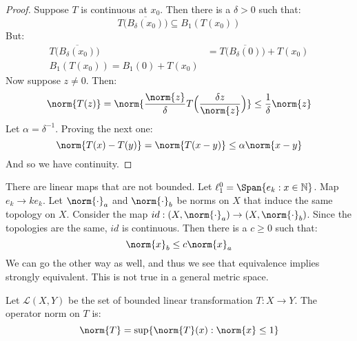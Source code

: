 \documentclass[crop=false,class=book,oneside]{standalone}
\begin{document}
        \begin{proof}
            Suppose $T$ is continuous at $x_{0}$. Then there is a
            $\delta>0$ such that:
            \begin{equation}
                T\Big(\overline{B_{\delta}(x_{0})}\big)
                \subseteq{B}_{1}(T(x_{0}))
            \end{equation}
            But:
            \begin{align}
                T\Big(\overline{B_{\delta}(x_{0})}\big)
                &=T\Big(\overline{B_{\delta}(0)}\big)+T(x_{0})\\
                B_{1}(T(x_{0}))=
                B_{1}(0)+T(x_{0})
            \end{align}
            Now suppose $z\ne{0}$. Then:
            \begin{equation}
                \norm{T(z)}=
                \norm{\frac{\norm{z}}{\delta}
                      T\Big(\frac{\delta{z}}{\norm{z}}\Big)}
                \leq\frac{1}{\delta}\norm{z}
            \end{equation}
            Let $\alpha=\delta^{\minus{1}}$.
            Proving the next one:
            \begin{equation}
                \norm{T(x)-T(y)}=\norm{T(x-y)}
                \leq\alpha\norm{x-y}
            \end{equation}
            And so we have continuity.
        \end{proof}
        There are linear maps that are not bounded. Let
        $\ell_{1}^{0}=\Span\{e_{k}:x\in\mathbb{N}\}$. Map
        $e_{k}\rightarrow{k}e_{k}$. Let
        $\norm{\cdot}_{a}$ and $\norm{\cdot}_{b}$ be norms on
        $X$ that induce the same topology on $X$. Consider the map
        $id:(X,\norm{\cdot}_{a})\rightarrow(X,\norm{\cdot}_{b})$.
        Since the topologies are the same, $id$ is continuous.
        Then there is a $c\geq{0}$ such that:
        \begin{equation}
            \norm{x}_{b}\leq{c}\norm{x}_{a}
        \end{equation}
        We can go the other way as well, and thus we see that
        equivalence implies strongly equivalent. This is not true
        in a general metric space.
        \begin{ldefinition}{}
            Let $\mathscr{L}(X,Y)$ be the set of bounded linear
            transformation $T:X\rightarrow{Y}$. The operator
            norm on $T$ is:
            \begin{equation}
                \norm{T}=\sup\{\norm{T}(x):\norm{x}\leq{1}\}
            \end{equation}
        \end{ldefinition}
\end{document}
